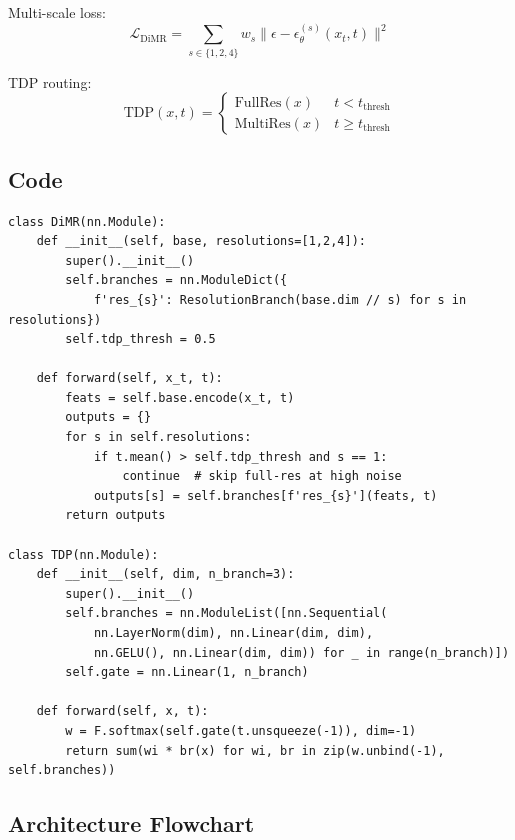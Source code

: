 \documentclass[11pt, a4paper]{article}
\begin{document}
Multi-scale loss:
\begin{equation}
    \mathcal{L}_{\mathrm{DiMR}} = \sum_{s \in \{1,2,4\}} w_s \|\epsilon - \epsilon_\theta^{(s)}(x_t, t)\|^2
\end{equation}

TDP routing:
\begin{equation}
    \mathrm{TDP}(x,t) = \begin{cases} \mathrm{FullRes}(x) & t < t_{\mathrm{thresh}} \\ \mathrm{MultiRes}(x) & t \geq t_{\mathrm{thresh}} \end{cases}
\end{equation}

\subsection{Code}

\begin{lstlisting}[caption={DiMR: Multi-Scale Targets and TDP}]
class DiMR(nn.Module):
    def __init__(self, base, resolutions=[1,2,4]):
        super().__init__()
        self.branches = nn.ModuleDict({
            f'res_{s}': ResolutionBranch(base.dim // s) for s in resolutions})
        self.tdp_thresh = 0.5

    def forward(self, x_t, t):
        feats = self.base.encode(x_t, t)
        outputs = {}
        for s in self.resolutions:
            if t.mean() > self.tdp_thresh and s == 1:
                continue  # skip full-res at high noise
            outputs[s] = self.branches[f'res_{s}'](feats, t)
        return outputs

class TDP(nn.Module):
    def __init__(self, dim, n_branch=3):
        super().__init__()
        self.branches = nn.ModuleList([nn.Sequential(
            nn.LayerNorm(dim), nn.Linear(dim, dim),
            nn.GELU(), nn.Linear(dim, dim)) for _ in range(n_branch)])
        self.gate = nn.Linear(1, n_branch)

    def forward(self, x, t):
        w = F.softmax(self.gate(t.unsqueeze(-1)), dim=-1)
        return sum(wi * br(x) for wi, br in zip(w.unbind(-1), self.branches))
\end{lstlisting}

\subsection{Architecture Flowchart}
\end{document}
